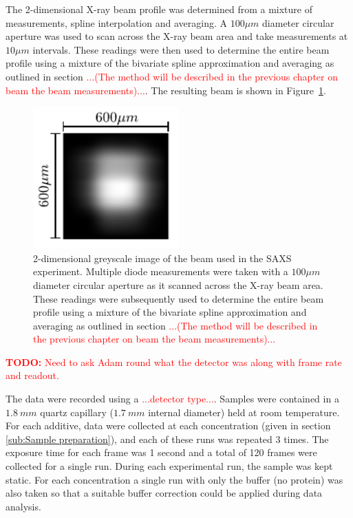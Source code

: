 The 2-dimensional X-ray beam profile was determined from a mixture of measurements, spline interpolation and averaging.
A $100 \mu m$ diameter circular aperture was used to scan across the X-ray beam area and take measurements at $10 \mu m$ intervals.
These readings were then used to determine the entire beam profile using a mixture of the bivariate spline approximation and averaging as outlined in section \textcolor{red}{...(The method will be described in the previous chapter on beam the beam measurements)...}. The resulting beam is shown in Figure~\ref{fig:SAXS beam profile}.
\begin{figure}
    \centering
    \includegraphics[width=0.5\textwidth]{figures/saxs/SAXS_beam.pdf}
    \caption{2-dimensional greyscale image of the beam used in the SAXS experiment. Multiple diode measurements were taken with a $100 \mu m$ diameter circular aperture as it scanned across the X-ray beam area. These readings were subsequently used to determine the entire beam profile using a mixture of the bivariate spline approximation and averaging as outlined in section \textcolor{red}{...(The method will be described in the previous chapter on beam the beam measurements)...}}
    \label{fig:SAXS beam profile}
\end{figure}

\textcolor{red}{
    \begin{myenumerate}
        \item \hypertarget{todo:Detector type}{\textbf{TODO:} Need to ask Adam round what the detector was along with frame rate and readout.}
    \end{myenumerate}
}
The data were recorded using a \textcolor{red}{...detector type...}.
Samples were contained in a $1.8\ mm$ quartz capillary ($1.7\ mm$ internal diameter) held at room temperature.
For each additive, data were collected at each concentration (given in section \ref{sub:Sample preparation}), and each of these runs was repeated 3 times.
The exposure time for each frame was 1 second and a total of 120 frames were collected for a single run.
During each experimental run, the sample was kept static.
For each concentration a single run with only the buffer (no protein) was also taken so that a suitable buffer correction could be applied during data analysis.

